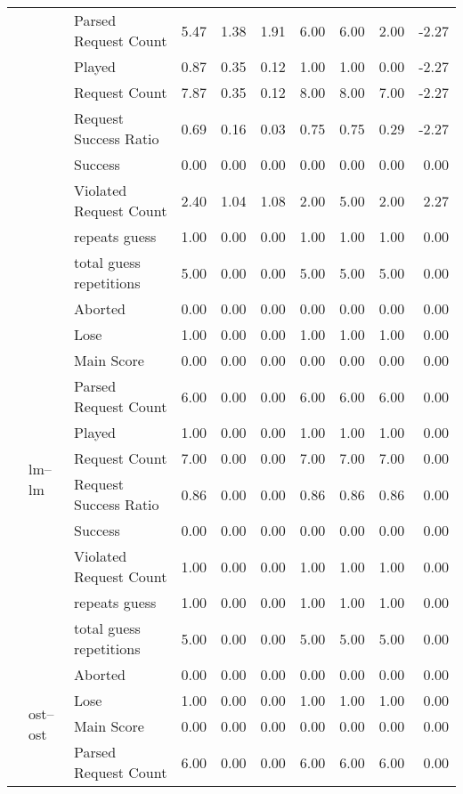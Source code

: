 \begin{tabular}{lllrrrrrrr}
 &  & Parsed Request Count & 5.47 & 1.38 & 1.91 & 6.00 & 6.00 & 2.00 & -2.27 \\
 &  & Played & 0.87 & 0.35 & 0.12 & 1.00 & 1.00 & 0.00 & -2.27 \\
 &  & Request Count & 7.87 & 0.35 & 0.12 & 8.00 & 8.00 & 7.00 & -2.27 \\
 &  & Request Success Ratio & 0.69 & 0.16 & 0.03 & 0.75 & 0.75 & 0.29 & -2.27 \\
 &  & Success & 0.00 & 0.00 & 0.00 & 0.00 & 0.00 & 0.00 & 0.00 \\
 &  & Violated Request Count & 2.40 & 1.04 & 1.08 & 2.00 & 5.00 & 2.00 & 2.27 \\
 &  & repeats guess & 1.00 & 0.00 & 0.00 & 1.00 & 1.00 & 1.00 & 0.00 \\
 &  & total guess repetitions & 5.00 & 0.00 & 0.00 & 5.00 & 5.00 & 5.00 & 0.00 \\
\cline{2-10}
 & \multirow[t]{11}{*}{lm--lm} & Aborted & 0.00 & 0.00 & 0.00 & 0.00 & 0.00 & 0.00 & 0.00 \\
 &  & Lose & 1.00 & 0.00 & 0.00 & 1.00 & 1.00 & 1.00 & 0.00 \\
 &  & Main Score & 0.00 & 0.00 & 0.00 & 0.00 & 0.00 & 0.00 & 0.00 \\
 &  & Parsed Request Count & 6.00 & 0.00 & 0.00 & 6.00 & 6.00 & 6.00 & 0.00 \\
 &  & Played & 1.00 & 0.00 & 0.00 & 1.00 & 1.00 & 1.00 & 0.00 \\
 &  & Request Count & 7.00 & 0.00 & 0.00 & 7.00 & 7.00 & 7.00 & 0.00 \\
 &  & Request Success Ratio & 0.86 & 0.00 & 0.00 & 0.86 & 0.86 & 0.86 & 0.00 \\
 &  & Success & 0.00 & 0.00 & 0.00 & 0.00 & 0.00 & 0.00 & 0.00 \\
 &  & Violated Request Count & 1.00 & 0.00 & 0.00 & 1.00 & 1.00 & 1.00 & 0.00 \\
 &  & repeats guess & 1.00 & 0.00 & 0.00 & 1.00 & 1.00 & 1.00 & 0.00 \\
 &  & total guess repetitions & 5.00 & 0.00 & 0.00 & 5.00 & 5.00 & 5.00 & 0.00 \\
\cline{2-10}
 & \multirow[t]{11}{*}{ost--ost} & Aborted & 0.00 & 0.00 & 0.00 & 0.00 & 0.00 & 0.00 & 0.00 \\
 &  & Lose & 1.00 & 0.00 & 0.00 & 1.00 & 1.00 & 1.00 & 0.00 \\
 &  & Main Score & 0.00 & 0.00 & 0.00 & 0.00 & 0.00 & 0.00 & 0.00 \\
 &  & Parsed Request Count & 6.00 & 0.00 & 0.00 & 6.00 & 6.00 & 6.00 & 0.00 \\

\end{tabular}
